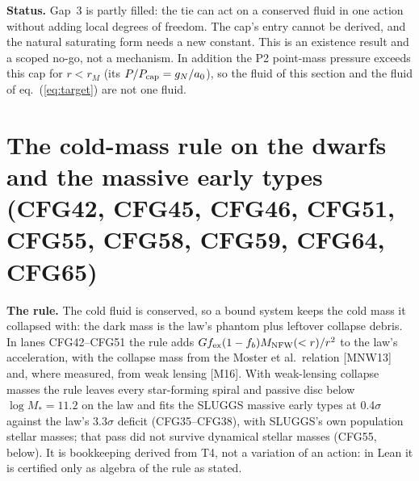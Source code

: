 \documentclass[10pt]{article}
\begin{document}
\textbf{Status.} Gap~3 is partly filled: the tie can act on a conserved fluid in one action without adding local degrees of freedom. The cap's entry cannot be derived, and the natural saturating form needs a new constant. This is an existence result and a scoped no-go, not a mechanism. In addition the P2 point-mass pressure exceeds this cap for $r<r_M$ (its $P/P_{\rm cap}=g_N/a_0$), so the fluid of this section and the fluid of eq.~(\ref{eq:target}) are not one fluid.

\section{The cold-mass rule on the dwarfs and the massive early types (CFG42, CFG45, CFG46, CFG51, CFG55, CFG58, CFG59, CFG64, CFG65)}\label{sec:dwarfs}

\textbf{The rule.} The cold fluid is conserved, so a bound system keeps the cold mass it collapsed with: the dark mass is the law's phantom plus leftover collapse debris. In lanes CFG42--CFG51 the rule adds $G f_{\rm ex}(1-f_b)M_{\rm NFW}(<r)/r^2$ to the law's acceleration, with the collapse mass from the Moster et al.\ relation [MNW13] and, where measured, from weak lensing [M16]. With weak-lensing collapse masses the rule leaves every star-forming spiral and passive disc below $\log M_*=11.2$ on the law and fits the SLUGGS massive early types at 0.4$\sigma$ against the law's 3.3$\sigma$ deficit (CFG35--CFG38), with SLUGGS's own population stellar masses; that pass did not survive dynamical stellar masses (CFG55, below). It is bookkeeping derived from T4, not a variation of an action: in Lean it is certified only as algebra of the rule as stated.
\end{document}

